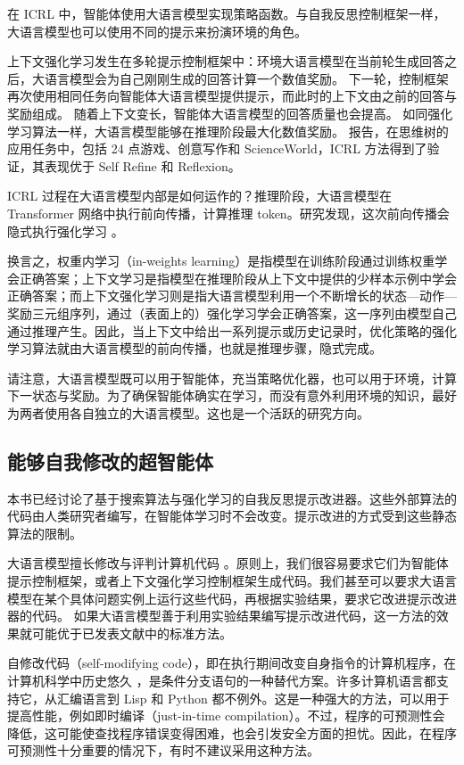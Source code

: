 在 ICRL 中，智能体使用大语言模型实现策略函数。与自我反思控制框架一样，大语言模型也可以使用不同的提示来扮演环境的角色。

上下文强化学习发生在多轮提示控制框架中：环境大语言模型在当前轮生成回答之后，大语言模型会为自己刚刚生成的回答计算一个数值奖励。
下一轮，控制框架再次使用相同任务向智能体大语言模型提供提示，而此时的上下文由之前的回答与奖励组成。
随着上下文变长，智能体大语言模型的回答质量也会提高。
如同强化学习算法一样，大语言模型能够在推理阶段最大化数值奖励。\citet{song2025reward} 报告，在思维树的应用任务中，包括 24 点游戏、创意写作和 ScienceWorld，ICRL 方法得到了验证，其表现优于 Self Refine 和 Reflexion。


ICRL 过程在大语言模型内部是如何运作的？推理阶段，大语言模型在 Transformer 网络中执行前向传播，计算推理 token。研究发现，这次前向传播会隐式执行强化学习 \citep{wang2024transformers}。


换言之，权重内学习（in-weights learning）是指模型在训练阶段通过训练权重学会正确答案；上下文学习是指模型在推理阶段从上下文中提供的少样本示例中学会正确答案；而上下文强化学习则是指大语言模型利用一个不断增长的状态—动作—奖励三元组序列，通过（表面上的）强化学习学会正确答案，这一序列由模型自己通过推理产生。因此，当上下文中给出一系列提示或历史记录时，优化策略的强化学习算法就由大语言模型的前向传播，也就是推理步骤，隐式完成。


请注意，大语言模型既可以用于智能体，充当策略优化器，也可以用于环境，计算下一状态与奖励。为了确保智能体确实在学习，而没有意外利用环境的知识，最好为两者使用各自独立的大语言模型。这也是一个活跃的研究方向。








\subsection{能够自我修改的超智能体}
本书已经讨论了基于搜索算法与强化学习的自我反思提示改进器。这些外部算法的代码由人类研究者编写，在智能体学习时不会改变。提示改进的方式受到这些静态算法的限制。

大语言模型擅长修改与评判计算机代码 \citep{zhuge2024agent}。原则上，我们很容易要求它们为智能体提示控制框架，或者上下文强化学习控制框架生成代码。我们甚至可以要求大语言模型在某个具体问题实例上运行这些代码，再根据实验结果，要求它改进提示改进器的代码。
如果大语言模型善于利用实验结果编写提示改进代码，这一方法的效果就可能优于已发表文献中的标准方法。

自修改代码（self-modifying code），即在执行期间改变自身指令的计算机程序，在计算机科学中历史悠久 \citep{cai2007certified}，是条件分支语句的一种替代方案。许多计算机语言都支持它，从汇编语言到 Lisp \citep{abelson2022structure} 和 Python 都不例外。这是一种强大的方法，可以用于提高性能，例如即时编译（just-in-time compilation）\citep{ansel2011language}。不过，程序的可预测性会降低，这可能使查找程序错误变得困难，也会引发安全方面的担忧。因此，在程序可预测性十分重要的情况下，有时不建议采用这种方法。

